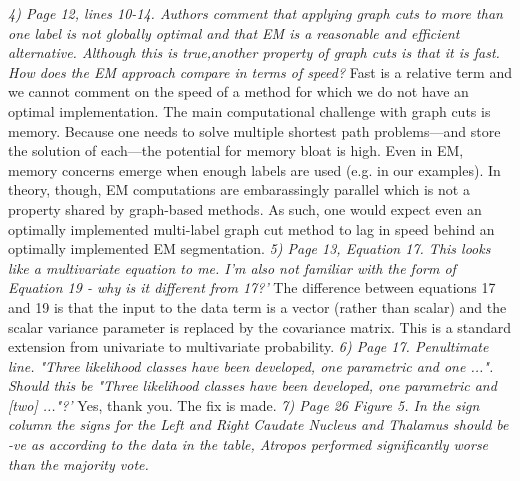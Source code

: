 \documentclass[11pt]{article}
\begin{document}
\newline
\newline
{\em 4) Page 12, lines 10-14. Authors comment that applying graph cuts
  to more than one label is not globally optimal and that EM is a
  reasonable and efficient alternative. Although this is true,another
  property of graph cuts is that it is fast. How does the EM approach
  compare in terms of speed?}
\newline
\newline
Fast is a relative term and we cannot comment on the speed of a method
for which we do not have an optimal implementation.  
The main computational challenge with graph cuts is memory.  Because one needs to
solve multiple shortest path problems---and store the solution of
each---the potential for memory bloat is high.  Even in EM, memory
concerns emerge when enough labels are used (e.g. in our examples).
In theory, though, EM computations are embarassingly parallel which is
not a property shared by graph-based methods.  As such, one would
expect even an optimally implemented multi-label graph cut method to
lag in speed behind an optimally implemented EM segmentation. 
\newline
\newline
{\em 5) Page 13, Equation 17. This looks like a multivariate equation to me. I'm also not familiar with the form of Equation 19 - why is it different from 17?'}
\newline
\newline
The difference between equations 17 and 19 is that the input to the
data term is a vector (rather than scalar) and the scalar variance
parameter is replaced by the covariance matrix.  This is a standard
extension from univariate to multivariate probability. 
\newline
\newline
{\em 6) Page 17. Penultimate line. "Three likelihood classes have been
  developed, one parametric and one ...". Should this be "Three
  likelihood classes have been developed, one parametric and [two]
  ..."?'}
\newline
\newline
Yes, thank you.  The fix is made.  
\newline
\newline
{\em 7) Page 26 Figure 5. In the sign column the signs for the Left
  and Right Caudate Nucleus and Thalamus should be -ve as according to
  the data in the table, Atropos performed significantly worse than
  the majority vote.}
\newline
\end{document}
